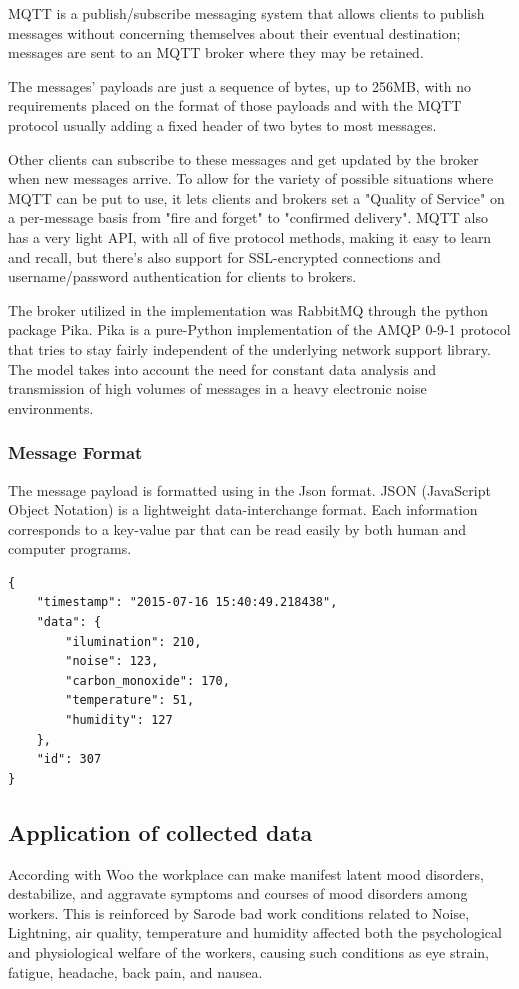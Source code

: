 \documentclass[conference]{IEEEtran}
\begin{document}
MQTT is a publish/subscribe messaging system that allows clients to publish messages without concerning themselves about their eventual destination; messages are sent to an MQTT broker where they may be retained.

The messages' payloads are just a sequence of bytes, up to 256MB, with no requirements placed on the format of those payloads and with the MQTT protocol usually adding a fixed header of two bytes to most messages.
 
Other clients can subscribe to these messages and get updated by the broker when new messages arrive. To allow for the variety of possible situations where MQTT can be put to use, it lets clients and brokers set a "Quality of Service" on a per-message basis from "fire and forget" to "confirmed delivery". MQTT also has a very light API, with all of five protocol methods, making it easy to learn and recall, but there's also support for SSL-encrypted connections and username/password authentication for clients to brokers.

The broker utilized in the implementation was RabbitMQ through the python package Pika. Pika is a pure-Python implementation of the AMQP 0-9-1 protocol that tries to stay fairly independent of the underlying network support library\cite{Pika}.
The model takes into account the need for constant data analysis and transmission of high volumes of messages in a heavy electronic noise environments.
\subsubsection{Message Format}
The message payload is formatted using in the Json format.
JSON (JavaScript Object Notation) is a lightweight data-interchange format\cite{Json}.
Each information corresponds to a key-value par that can be read easily by both human and computer programs.
\begin{lstlisting}
{
    "timestamp": "2015-07-16 15:40:49.218438",
    "data": {
        "ilumination": 210,
        "noise": 123,
        "carbon_monoxide": 170,
        "temperature": 51,
        "humidity": 127
    },
    "id": 307
}

\end{lstlisting}
\subsection{Application of collected data}
According with Woo\cite{Woo2008} the workplace can make manifest latent mood disorders, destabilize, and aggravate symptoms and courses of mood disorders among workers. This is reinforced by Sarode\cite{Sarode2014} bad work conditions related to Noise, Lightning, air quality, temperature and humidity affected both the psychological and physiological welfare of the workers, causing such conditions as eye strain, fatigue, headache, back pain, and nausea.
\end{document}
